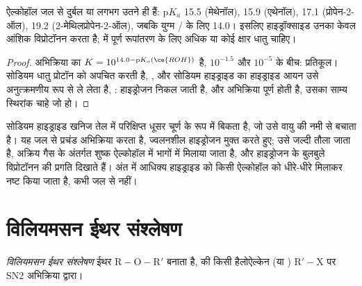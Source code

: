 \begin{proposition}[ऐल्कोहॉलों की अम्लता]\label{prop:b1:alcohol-activation:alcohol-acidity}
ऐल्कोहॉल जल से दुर्बल या लगभग उतने ही  हैं: $\mathrm{p}K_a$
15.5 (मेथेनॉल), 15.9 (एथेनॉल), 17.1 (प्रोपेन-2-ऑल), 19.2
(2-मेथिलप्रोपेन-2-ऑल), जबकि युग्म / के लिए 14.0।
इसलिए हाइड्रॉक्साइड उनका केवल आंशिक विप्रोटॉनन करता है;  में
पूर्ण रूपांतरण के लिए अधिक  या कोई क्षार धातु चाहिए।
\end{proposition}

\begin{proof}
अभिक्रिया  का $K = 10^{14.0 -
\mathrm{p}K_a(\ce{ROH})}$ है, $10^{-1.5}$ और $10^{-5}$ के बीच: प्रतिकूल।
सोडियम धातु प्रोटॉन को अपचित करती है, , और
सोडियम हाइड्राइड का हाइड्राइड आयन उसे अनुत्क्रमणीय रूप से ले लेता है,
: हाइड्रोजन निकल जाती है, और अभिक्रिया
पूर्ण होती है, उसका साम्य स्थिरांक चाहे जो हो।
\end{proof}

\begin{inthelab}[सोडियम हाइड्राइड]
सोडियम हाइड्राइड खनिज तेल में परिक्षिप्त धूसर चूर्ण के रूप में बिकता है, जो
उसे वायु की नमी से बचाता है। यह जल से प्रचंड अभिक्रिया करता है,
ज्वलनशील हाइड्रोजन मुक्त करते हुए; उसे जल्दी तौला जाता है, अक्रिय गैस के अंतर्गत
शुष्क ऐल्कोहॉल में भागों में मिलाया जाता है, और हाइड्रोजन के बुलबुले
विप्रोटॉनन की प्रगति दिखाते हैं। अंत में आधिक्य हाइड्राइड को किसी ऐल्कोहॉल को
धीरे-धीरे मिलाकर नष्ट किया जाता है, कभी जल से नहीं।
\end{inthelab}

\section{विलियमसन ईथर संश्लेषण}

\begin{definition}\label{def:b1:alcohol-activation:williamson}
\emph{विलियमसन ईथर संश्लेषण}
ईथर $\mathrm{R{-}O{-}R'}$ बनाता है,   की
किसी हैलोऐल्केन (या ) $\mathrm{R'{-}X}$ पर SN2 अभिक्रिया द्वारा।
\end{definition}

